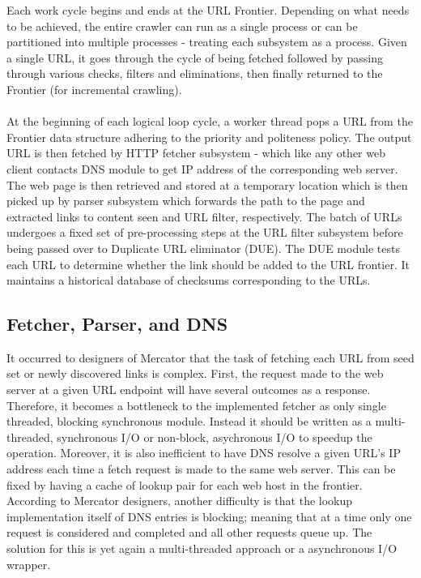 \noindent
Each work cycle begins and ends at the URL Frontier. Depending on what needs to be
achieved, the entire crawler can run as a single process or can be partitioned into multiple processes - treating each subsystem as a process. Given a single URL, it
goes through the cycle of being fetched followed by passing through various checks,
filters and eliminations, then finally returned to the Frontier (for incremental crawling).
\\
\\
At the beginning of each logical loop cycle, a worker thread pops a URL from the Frontier data structure adhering to the priority and politeness policy. The output URL is then fetched by HTTP fetcher subsystem - which like any other web client contacts DNS module to get IP address of the corresponding web server. The web page is then retrieved and stored at a temporary location which is then picked up by parser subsystem which forwards the path to the page and extracted links to content seen and URL filter, respectively. The batch of URLs undergoes a fixed set of pre-processing steps at the URL filter subsystem before being passed over to Duplicate URL eliminator (DUE). The DUE module tests each URL to determine whether the link should be added to the URL frontier. It maintains a historical database of checksums corresponding to the URLs.

\pagebreak

\subsection{Fetcher, Parser, and DNS}
It occurred to designers of Mercator that the task of fetching each URL from seed set or newly discovered
links is complex. First, the request made to the web server at a given URL endpoint will have several outcomes as a response. Therefore, it becomes a bottleneck to the implemented fetcher as only single threaded, blocking synchronous module. Instead it should be written as a multi-threaded, synchronous I/O or non-block,
asychronous I/O to speedup the operation. Moreover, it is also inefficient to have DNS resolve a given URL's
IP address each time a fetch request is made to the same web server. This can be fixed by having a cache of
lookup pair for each web host in the frontier. According to Mercator designers, another difficulty is that the lookup implementation itself of DNS entries is blocking; meaning that at a time only one request is considered and completed and all other requests queue up. The solution for this is yet again a multi-threaded approach
or a asynchronous I/O wrapper.

